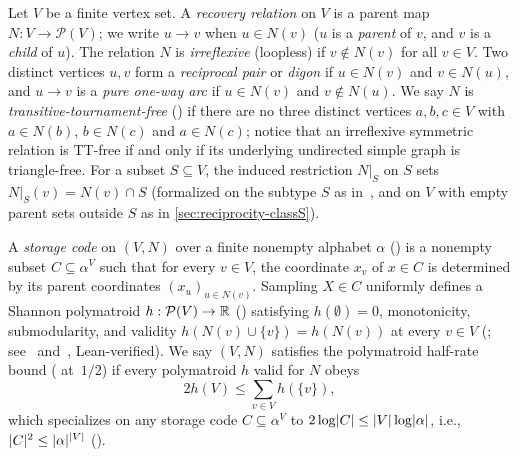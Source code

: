 Let $V$ be a finite vertex set. A \emph{recovery relation} on $V$ is a parent map $N : V \to \mathcal{P}(V)$; we write
$u \to v$ when $u \in N(v)$ ($u$ is a \emph{parent} of $v$, and $v$ is a \emph{child} of $u$). The relation $N$ is
\emph{irreflexive} (loopless) if $v \notin N(v)$ for all $v \in V$. Two distinct vertices $u, v$ form a \emph{reciprocal
pair} or \emph{digon} if $u \in N(v)$ and $v \in N(u)$, and $u \to v$ is a \emph{pure one-way arc} if $u \in N(v)$ and
$v \notin N(u)$. We say $N$ is \emph{transitive-tournament-free} () if there are no three distinct
vertices $a, b, c \in V$ with $a \in N(b)$, $b \in N(c)$ and $a \in N(c)$; notice that an irreflexive symmetric relation is
TT-free if and only if its underlying undirected simple graph is triangle-free. For a subset $S \subseteq V$, the induced
restriction $N|_S$ on $S$ sets $N|_S(v) = N(v) \cap S$ (formalized on the subtype $S$ as
 in~\cite{DirectedRecovery2026}, and on $V$ with empty parent sets outside $S$ as
 in \cref{sec:reciprocity-classS}).

A \emph{storage code} on $(V, N)$ over a finite nonempty alphabet $\alpha$ () is a
nonempty subset $C \subseteq \alpha^V$ such that for every $v \in V$, the coordinate $x_v$ of $x \in C$ is determined by
its parent coordinates $(x_u)_{u \in N(v)}$. Sampling $X \in C$ uniformly defines a Shannon polymatroid
$h : \mathcal{P}(V) \to \mathbb{R}$ () satisfying $h(\emptyset) = 0$, monotonicity,
submodularity, and validity $h(N(v) \cup \{v\}) = h(N(v))$ at every $v \in V$ (;
see~\cite[Section~4]{FourthPaper2026} and~\cite[Section~2]{SeventhPaper2026}, Lean-verified). We say $(V, N)$ satisfies the
polymatroid half-rate bound ( at~$1/2$) if every polymatroid $h$ valid for $N$ obeys
\begin{equation}\label{eq:half-rate}
  2 h(V) \le \sum_{v \in V} h(\{v\}),
\end{equation}
which specializes on any storage code $C \subseteq \alpha^V$ to $2 \log \lvert C \rvert \le \lvert V \rvert \log \lvert \alpha \rvert$, i.e.,
$\lvert C \rvert^2 \le \lvert \alpha \rvert^{\lvert V \rvert}$ ().

